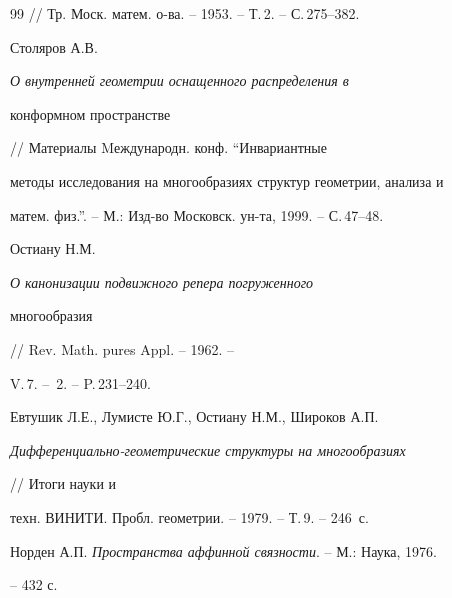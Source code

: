 \begin{thebibliography}{99}
// Тр. Моск. матем. о-ва. -- 1953. -- Т.\,2. -- С.\,275--382. 




Столяров А.В. {\em О внутренней геометрии оснащенного распределения в 


конформном пространстве} // Материалы Mеждународн. конф. ``Инвариантные 


методы исследования на многообразиях структур геометрии, анализа и 


матем. физ.''. -- М.: Изд-во Московск. ун-та, 1999. -- С.\,47--48. 




Остиану Н.М. {\em О канонизации подвижного репера погруженного 


многообразия} // Rev. Math. pures Appl. -- 1962. -- 


V.\,7. -- \No\,2. -- P.\,231--240. 




Евтушик Л.Е., Лумисте Ю.Г., Остиану Н.М., Широков А.П. 


{\em Дифференциально-геометрические структуры на многообразиях} 


// Итоги науки и 


техн. ВИНИТИ. Пробл. геометрии. -- 1979. -- Т.\,9. -- 246~с. 




Норден А.П. {\em Пространства аффинной связности}. -- М.: Наука, 1976. 


-- 432 с. 


 


\end{thebibliography} 


 


\vskip 2cm 


 






 


\label{end} 


 


 


